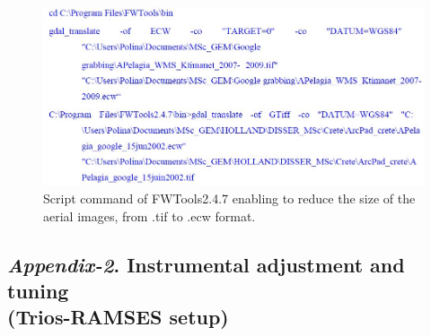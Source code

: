 \documentclass[11pt]{article}
\begin{document}
\begin{appendices}
\begin{figure}[H]
	\begin{center}
		\includegraphics[scale=0.4]{Script_Gdal.jpg}
		\caption{Script command of FWTools2.4.7 enabling to reduce the size of the aerial images, from .tif to .ecw format.}
	\end{center}
	\label{fig:A.2}
\end{figure}
\pagebreak

\subsection[\textit{Appendix-2}. Instrumental adjustment and tuning]{\textit{Appendix-2}. Instrumental adjustment and tuning \\ (Trios-RAMSES setup)}


\end{appendices}
\end{document}
